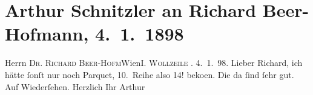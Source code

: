 

         
         \renewcommand{\erwaehntePersonen}{Personen: Richard Beer-Hofmann}
         \renewcommand{\erwaehnteOrte}{Orte: Wien, Wollzeile}
         \renewcommand{\erwaehnteWerke}{}
               \section[Arthur Schnitzler an Richard Beer-Hofmann, 4. 1. 1898]{ Arthur Schnitzler an Richard Beer-Hofmann, 4. 1. 1898}\nopagebreak{}\rehead{ }\begin{ledgroupsized}[t]{13cm}\normalsize\beginnumbering \toendnotes[C]{\smallbreak\pagebreak[2]} 
\pstart{}{\pb}Herrn \textsc{Dr. Richard
                        Beer-Hofm}\pend{}\pstart{}Wien\pend{}\pstart{}\textsc{I. Wollzeile{ }}.\pend{}{\bigskip}\pstart
           \raggedleft{}{\pb}4. 1. 98.\pend
           \pstart
           Lieber Richard, ich hätte ſonſt nur noch Parquet, 10. Reihe also 14!
                  beko{\geminationm}en. Die da ſind ſehr gut. Auf Wiederſehen.
               Herzlich Ihr\pend
           \pstart \spacefill\mbox{Arthur}\pend{}
         
         \endnumbering{}\end{ledgroupsized}  \newcommand{\dateiname}{L00758}\newcommand{\titel}{Arthur Schnitzler an Richard Beer-Hofmann, 4. 1. 1898}\newcommand{\editorInnen}{Martin Anton Müller und Gerd-Hermann Susen}
      